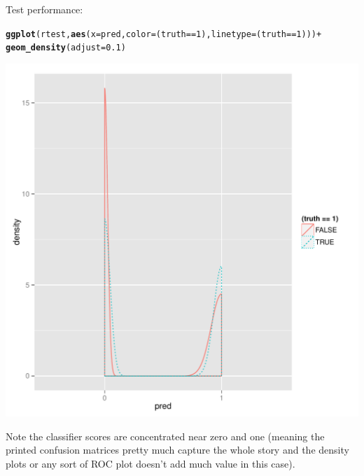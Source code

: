 \documentclass{article}\usepackage[]{graphicx}\usepackage[]{color}
\makeatletter
\def\maxwidth{ %
  \ifdim\Gin@nat@width>\linewidth
    \linewidth
  \else
    \Gin@nat@width
  \fi
}
\newcommand{\hlnum}[1]{\textcolor[rgb]{0.686,0.059,0.569}{#1}}%
\newcommand{\hlopt}[1]{\textcolor[rgb]{0,0,0}{#1}}%
\newcommand{\hlstd}[1]{\textcolor[rgb]{0.345,0.345,0.345}{#1}}%
\newcommand{\hlkwc}[1]{\textcolor[rgb]{0.333,0.667,0.333}{#1}}%
\newcommand{\hlkwd}[1]{\textcolor[rgb]{0.737,0.353,0.396}{\textbf{#1}}}%
\newenvironment{kframe}{%
 \def\at@end@of@kframe{}%
 \ifinner\ifhmode%
  \def\at@end@of@kframe{\end{minipage}}%
  \begin{minipage}{\columnwidth}%
 \fi\fi%
 \def\FrameCommand##1{\hskip\@totalleftmargin \hskip-\fboxsep
 \colorbox{shadecolor}{##1}\hskip-\fboxsep
     \hskip-\linewidth \hskip-\@totalleftmargin \hskip\columnwidth}%
 \MakeFramed {\advance\hsize-\width
   \@totalleftmargin\z@ \linewidth\hsize
   \@setminipage}}%
 {\par\unskip\endMakeFramed%
 \at@end@of@kframe}
\newenvironment{knitrout}{}{} %
\makeatother
\begin{document}
Test performance:
\begin{knitrout}
\color{fgcolor}\begin{kframe}
\begin{alltt}
\hlkwd{ggplot}\hlstd{(rtest,} \hlkwd{aes}\hlstd{(}\hlkwc{x}\hlstd{=pred,} \hlkwc{color}\hlstd{=(truth}\hlopt{==}\hlnum{1}\hlstd{),}\hlkwc{linetype}\hlstd{=(truth}\hlopt{==}\hlnum{1}\hlstd{)))} \hlopt{+}
   \hlkwd{geom_density}\hlstd{(}\hlkwc{adjust}\hlstd{=}\hlnum{0.1}\hlstd{)}
\end{alltt}
\end{kframe}
\includegraphics[width=\maxwidth]{figure/plottest} 

\end{knitrout}


Note the classifier scores are concentrated near zero and one
(meaning the printed confusion matrices pretty much capture the whole
story and the density plots or any sort of ROC plot doesn't add much
value in this case).

\pagebreak
\end{document}
